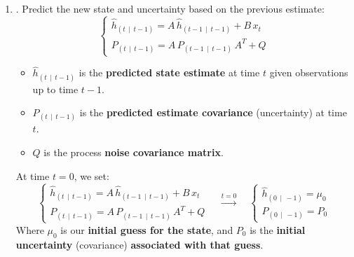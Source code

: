 \begin{enumerate}
    \item {}. Predict the new state and uncertainty based on the previous estimate:
    \begin{equation}
        \begin{cases}
            \hat{h}_{\left(t \, \mid \, t-1\right)} = A \, \hat{h}_{\left(t-1 \, \mid \, t-1\right)} + B \, x_t \\[.3em]
            P_{\left(t \, \mid \, t-1\right)} = A \, P_{\left(t-1 \, \mid \, t-1\right)} \, A^{T} + Q
        \end{cases}
    \end{equation}
    \begin{itemize}
        \item $\hat{h}_{\left(t \, \mid \, t-1\right)}$ is the \textbf{predicted state estimate} at time $t$ given observations up to time $t-1$.
        \item $P_{\left(t \, \mid \, t-1\right)}$ is the \textbf{predicted estimate covariance} (uncertainty) at time $t$.
        \item $Q$ is the process \textbf{noise covariance matrix}.
    \end{itemize}
    At time $t=0$, we set:
    \begin{equation*}
        \begin{cases}
            \hat{h}_{\left(t \, \mid \, t-1\right)} = A \, \hat{h}_{\left(t-1 \, \mid \, t-1\right)} + B \, x_t \\[.3em]
            P_{\left(t \, \mid \, t-1\right)} = A \, P_{\left(t-1 \, \mid \, t-1\right)} \, A^{T} + Q
        \end{cases}
        \quad
        \xrightarrow{t=0}
        \quad
        \begin{cases}
            \hat{h}_{\left(0 \, \mid \, -1\right)} = \mu_0 \\
            P_{\left(0 \, \mid \, -1\right)} = P_0
        \end{cases}
    \end{equation*}
    Where $\mu_0$ is our \textbf{initial guess for the state}, and $P_0$ is the \textbf{initial uncertainty} (covariance) \textbf{associated with that guess}.



\end{enumerate}
